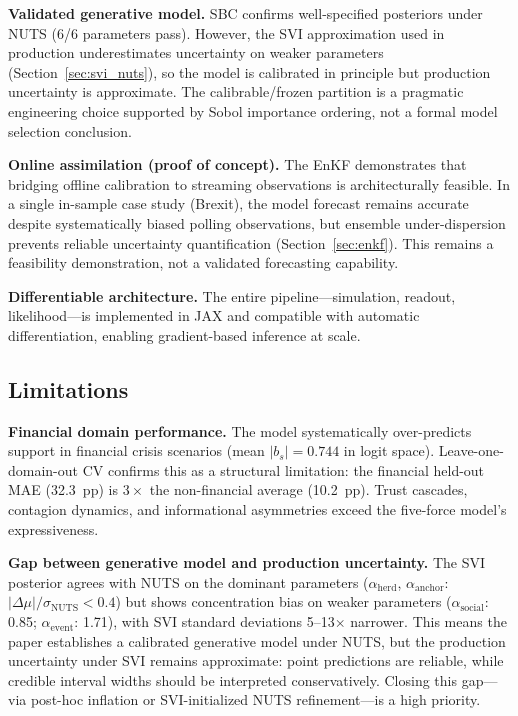 \documentclass[12pt]{article}
\begin{document}
\textbf{Validated generative model.} SBC confirms well-specified posteriors under NUTS (6/6 parameters pass). However, the SVI approximation used in production underestimates uncertainty on weaker parameters (Section~\ref{sec:svi_nuts}), so the model is calibrated in principle but production uncertainty is approximate. The calibrable/frozen partition is a pragmatic engineering choice supported by Sobol importance ordering, not a formal model selection conclusion.

\textbf{Online assimilation (proof of concept).} The EnKF demonstrates that bridging offline calibration to streaming observations is architecturally feasible. In a single in-sample case study (Brexit), the model forecast remains accurate despite systematically biased polling observations, but ensemble under-dispersion prevents reliable uncertainty quantification (Section~\ref{sec:enkf}). This remains a feasibility demonstration, not a validated forecasting capability.

\textbf{Differentiable architecture.} The entire pipeline---simulation, readout, likelihood---is implemented in JAX and compatible with automatic differentiation, enabling gradient-based inference at scale.

\subsection{Limitations}

\textbf{Financial domain performance.} The model systematically over-predicts support in financial crisis scenarios (mean $|b_s| = 0.744$ in logit space). Leave-one-domain-out CV confirms this as a structural limitation: the financial held-out MAE (32.3~pp) is $3\times$ the non-financial average (10.2~pp). Trust cascades, contagion dynamics, and informational asymmetries exceed the five-force model's expressiveness.

\textbf{Gap between generative model and production uncertainty.} The SVI posterior agrees with NUTS on the dominant parameters ($\alpha_{\text{herd}}$, $\alpha_{\text{anchor}}$: $|\Delta\mu|/\sigma_{\text{NUTS}} < 0.4$) but shows concentration bias on weaker parameters ($\alpha_{\text{social}}$: 0.85; $\alpha_{\text{event}}$: 1.71), with SVI standard deviations 5--13$\times$ narrower. This means the paper establishes a calibrated generative model under NUTS, but the production uncertainty under SVI remains approximate: point predictions are reliable, while credible interval widths should be interpreted conservatively. Closing this gap---via post-hoc inflation or SVI-initialized NUTS refinement---is a high priority.
\end{document}
